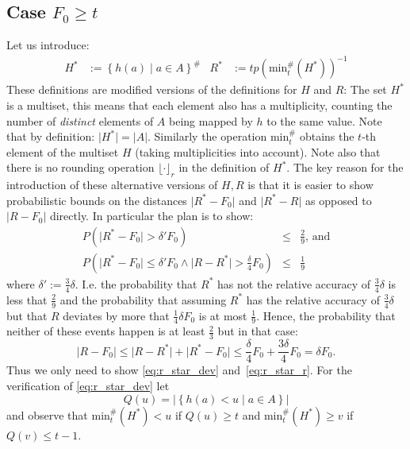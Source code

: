 \documentclass[11pt,a4paper]{article}
\newcommand{\size}[1]{\lvert#1\rvert}
\begin{document}
\subsection{Case $F_0 \geq t$}
Let us introduce:
\begin{align*}
    H^* & := \left\{ h(a) \middle \vert a \in A \right\}^{\#} &
    R^* & := tp \left( \mathrm{min}^{\#}_t(H^*) \right)^{-1}
\end{align*}
These definitions are modified versions of the definitions for $H$ and $R$:
The set $H^*$ is a multiset, this means that each element also has a multiplicity, counting the
number of \emph{distinct} elements of $A$ being mapped by $h$ to the same value.
Note that by definition: $\size{H^*}=\size{A}$.
Similarly the operation $\mathrm{min}^{\#}_t$ obtains the $t$-th element of the multiset $H$ (taking multiplicities into account).
Note also that there is no rounding operation $\lfloor \cdot \rfloor_r$ in the definition of $H^*$.
The key reason for the introduction of these alternative versions of $H, R$ is that it is easier to
show probabilistic bounds on the distances $\size{R^* - F_0}$ and $\size{R^* - R}$ as opposed to 
$\size{R - F_0}$ directly.
In particular the plan is to show:
\begin{eqnarray}
 P\left(\size{R^*-F_0} > \delta' F_0\right) & \leq & \frac{2}{9} \textrm{, and} \label{eq:r_star_dev} \\
 P\left(\size{R^*-F_0} \leq \delta' F_0 \wedge \size{R-R^*} > \frac{\delta}{4} F_0\right) & \leq & \frac{1}{9} \label{eq:r_star_r}
\end{eqnarray}
where $\delta' := \frac{3}{4} \delta$.
I.e. the probability that $R^*$ has not the relative accuracy of $\frac{3}{4}\delta$ is less that $\frac{2}{9}$ and the probability 
that assuming $R^*$ has the relative accuracy of $\frac{3}{4}\delta$ but that $R$ deviates by more that $\frac{1}{4}\delta F_0$ is at most $\frac{1}{9}$.
Hence, the probability that neither of these events happen is at least $\frac{2}{3}$ but in that case:
\begin{equation}
    \label{eq:concl}
    \size{R-F_0} \leq \size{R - R^*} + \size{R^*-F_0} \leq \frac{\delta}{4} F_0 + \frac{3 \delta}{4} F_0 = \delta F_0 \textrm{.}
\end{equation}
Thus we only need to show \autoref{eq:r_star_dev} and~\ref{eq:r_star_r}. For the verification of \autoref{eq:r_star_dev} let
\[
    Q(u) = \size{\left\{h(a) < u \mid a \in A \right\}}
\]
and observe that $\mathrm{min}_t^{\#}(H^*) < u$ if $Q(u) \geq t$ and $\mathrm{min}_t^{\#}(H^*) \geq v$ if $Q(v) \leq t-1$.
\end{document}
